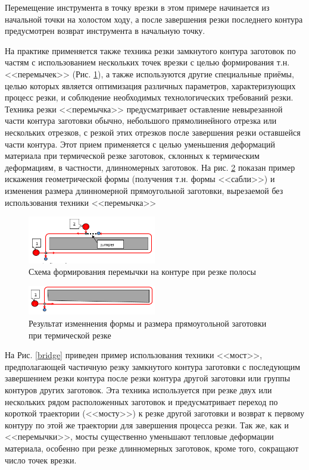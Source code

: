 \documentclass[11pt,twoside]{report}
\begin{document}
Перемещение инструмента в точку врезки
в этом примере начинается из начальной точки на холостом ходу,
а после завершения резки последнего контура
предусмотрен возврат инструмента в начальную точку.

На практике применяется также техника резки
замкнутого контура заготовок по частям
с использованием нескольких точек врезки
с целью формирования т.н. <<перемычек>>
(Рис. \ref{jumper}),
а также используются другие специальные приёмы,
целью которых является оптимизация различных параметров,
характеризующих процесс резки,
и соблюдение необходимых технологических требований резки.
Техника резки <<перемычка>> предусматривает
оставление невырезанной части контура заготовки обычно,
небольшого прямолинейного отрезка или нескольких отрезков,
с резкой этих отрезков после завершения резки оставшейся части контура.
Этот прием применяется с целью уменьшения деформаций материала
при термической резке заготовок, склонных к термическим деформациям,
в частности, длинномерных заготовок.
На рис. \ref{saber} показан пример искажения геометрической формы
(получения т.н. формы <<сабли>>)
и изменения размера длинномерной прямоугольной заготовки,
вырезаемой без использования техники <<перемычка>>

\begin{figure}
  \begin{center}
  \includegraphics[width=0.5\textwidth]{jumper.png}
  \caption{Схема формирования перемычки на контуре при резке полосы}
  \label{jumper}
  \end{center}
\end{figure}

\begin{figure}
  \begin{center}
  \includegraphics[width=0.5\textwidth]{saber.png}
  \caption{Результат изменнения формы и размера прямоугольной заготовки при термической резке}
  \label{saber}
  \end{center}
\end{figure}

На Рис. \ref{bridge}
приведен пример использования техники <<мост>>,
предполагающей  частичную резку замкнутого контура
заготовки с последующим завершением резки контура
после резки контура другой заготовки или
группы контуров других заготовок.
Эта техника используется при резке двух или
нескольких рядом расположенных заготовок и
предусматривает переход по короткой траектории (<<мосту>>)
к резке другой заготовки и возврат к первому контуру
по этой же траектории для завершения процесса резки.
Так же, как и <<перемычки>>,
мосты существенно уменьшают тепловые деформации материала,
особенно при резке длинномерных заготовок,
кроме того, сокращают число точек врезки.
\end{document}

